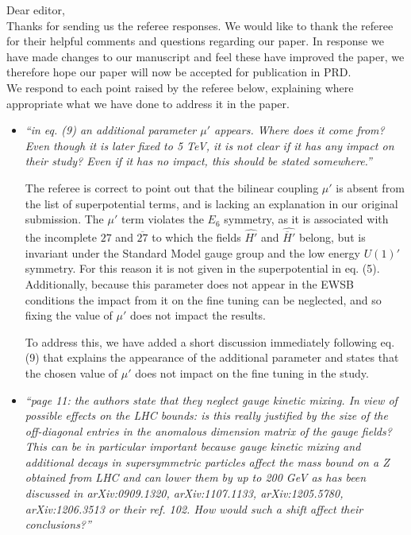 \documentclass[12pt]{article}
\begin{document}
\noindent Dear editor,
\\

\noindent Thanks for sending us the referee responses. We would like to thank
the referee for their helpful comments and questions regarding our
paper. In response we have made changes to our manuscript and feel
these have improved the paper, we therefore hope our paper will now be
accepted for publication in PRD.
\\
\noindent We respond to each point raised by the referee below, explaining
where appropriate what we have done to address it in the paper.

\begin{itemize}
\item {\it ``in eq. (9) an additional parameter $\mu'$ appears.  Where
does it come from?  Even though it is later fixed to 5 TeV, it is not
clear if it has any impact on their study?  Even if it has no impact,
this should be stated somewhere.''}

The referee is correct to point out that the bilinear coupling $\mu'$ is
absent from the list of superpotential terms, and is lacking an explanation
in our original submission. The $\mu'$ term violates the $E_6$ symmetry, as
it is associated with the incomplete $27$ and $\overline{27}$ to which the
fields $\hat{H'}$ and $\hat{\overline{H}'}$ belong, but is invariant under
the Standard Model gauge group and the low energy $U(1)'$ symmetry. For this
reason it is not given in the superpotential in eq. (5). Additionally, because
this parameter does not appear in the EWSB conditions the impact from it on
the fine tuning can be neglected, and so fixing the value of $\mu'$ does not
impact the results.

To address this, we have added a short discussion immediately
following eq. (9) that explains the appearance of the additional parameter
and states that the chosen value of $\mu'$ does not impact on the fine
tuning in the study.

\item {\it ``page 11: the authors state that they neglect gauge kinetic
mixing.  In view of possible effects on the LHC bounds: is this really
justified by the size of the off-diagonal entries in the anomalous
dimension matrix of the gauge fields?  This can be in particular important
because gauge kinetic mixing and additional decays in supersymmetric
particles affect the mass bound on a Z obtained from LHC and can lower them
by up to 200 GeV as has been discussed in arXiv:0909.1320, arXiv:1107.1133,
arXiv:1205.5780, arXiv:1206.3513 or their ref. 102.  How would such a shift
affect their conclusions?''}


\end{itemize}
\end{document}
